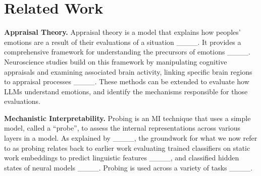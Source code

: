 \section{Related Work}
\textbf{Appraisal Theory.}
Appraisal theory is a model that explains how peoples' emotions are a result of their evaluations of a situation ____. It provides a comprehensive framework for understanding the precursors of emotions ____. Neuroscience studies build on this framework by manipulating cognitive appraisals and examining associated brain activity, linking specific brain regions to appraisal processes ____. These methods can be extended to evaluate how LLMs understand emotions, and identify the mechanisms responsible for those evaluations. 




\textbf{Mechanistic Interpretability.}
Probing is an MI technique that uses a simple model, called a “probe”, to assess the internal representations across various layers in a model. As explained by ____, the groundwork for what we now refer to as probing relates back to earlier work evaluating trained classifiers on static work embeddings to predict linguistic features ____, and classified hidden states of neural models ____. Probing is used across a variety of tasks ____. 

